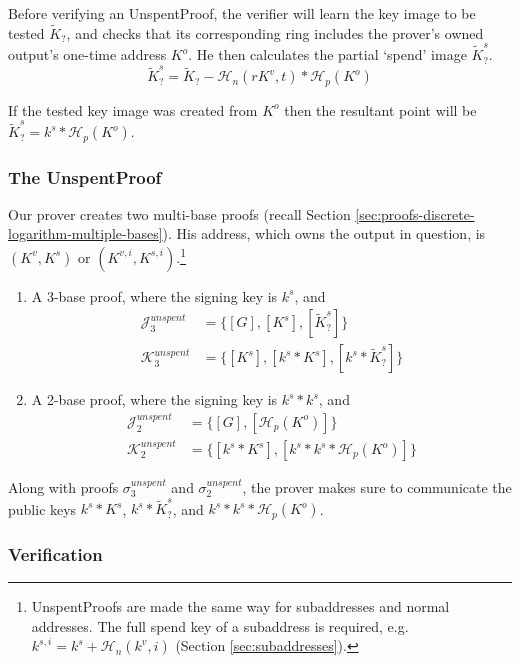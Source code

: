 Before verifying an UnspentProof, the verifier will learn the key image to be tested $\tilde{K}_?$, and checks that its corresponding ring includes the prover's owned output's one-time address $K^o$. He then calculates the partial `spend' image $\tilde{K}^s_?$.\vspace{.175cm}
\[\tilde{K}^s_? = \tilde{K}_? - \mathcal{H}_n(r K^v,t)*\mathcal{H}_p(K^o)\]

If the tested key image was created from $K^o$ then the resultant point will be $\tilde{K}^s_? = k^s*\mathcal{H}_p(K^o)$.

\subsubsection*{The UnspentProof}

Our prover creates two multi-base proofs (recall Section \ref{sec:proofs-discrete-logarithm-multiple-bases}). His address, which owns the output in question, is $(K^v, K^s)$ or $(K^{v,i}, K^{s,i})$.\footnote{UnspentProofs are made the same way for subaddresses and normal addresses. The full spend key of a subaddress is required, e.g. $k^{s,i} = k^s + \mathcal{H}_n(k^v,i)$ (Section \ref{sec:subaddresses}).}

\begin{enumerate}
    \item A 3-base proof, where the signing key is $k^s$, and\vspace{.175cm}
    \begin{align*}
        \mathcal{J}^{unspent}_3 &= \{[G], [K^s], [\tilde{K}^s_?]\}\\
        \mathcal{K}^{unspent}_3 &= \{[K^s], [k^s*K^s], [k^s*\tilde{K}^s_?]\}
    \end{align*}{}
    \item A 2-base proof, where the signing key is $k^s*k^s$, and\vspace{.175cm}
    \begin{align*}
        \mathcal{J}^{unspent}_2 &= \{[G], [\mathcal{H}_p(K^o)]\}\\
        \mathcal{K}^{unspent}_2 &= \{[k^s*K^s], [k^s*k^s*\mathcal{H}_p(K^o)]\}
    \end{align*}{}
\end{enumerate}{}

Along with proofs $\sigma^{unspent}_3$ and $\sigma^{unspent}_2$, the prover makes sure to communicate the public keys $k^s*K^s$, $k^s*\tilde{K}^s_?$, and $k^s*k^s*\mathcal{H}_p(K^o)$.

\subsubsection*{Verification}


